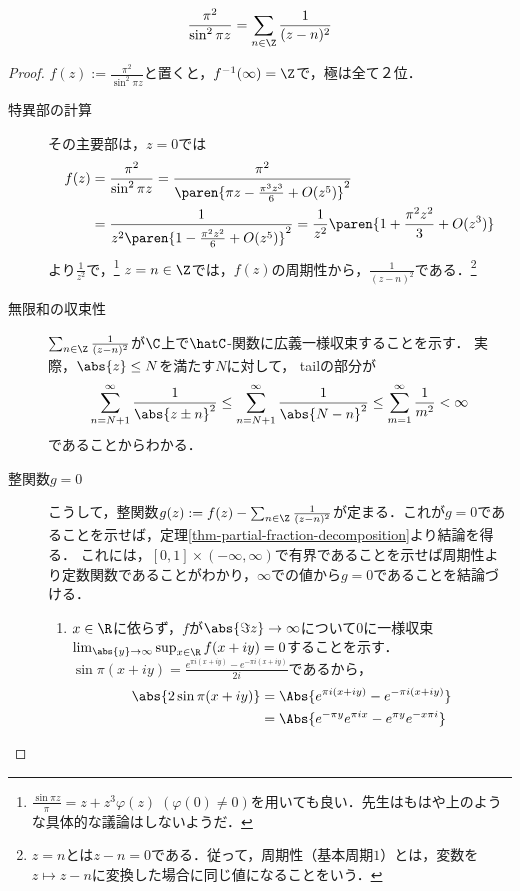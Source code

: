 \documentclass[uplatex, dvipdfmx]{jsreport}
\begin{document}
\begin{proposition}[自乗のものは解きやすい]\label{prop-partial-fractional-decomposition}
    \[\frac{\pi^2}{\sin^2\pi z}=\sum_{n\in\Z}\frac{1}{(z-n)^2}\]
\end{proposition}
\begin{proof}
    $f(z):=\frac{\pi^2}{\sin^2\pi z}$と置くと，$f^{-1}(\infty)=\Z$で，極は全て２位．
    \begin{description}
        \item[特異部の計算]
    その主要部は，$z=0$では
    \begin{align*}
        f(z)&=\frac{\pi^2}{\sin^2\pi z}=\frac{\pi^2}{\paren{\pi z-\frac{\pi^3z^3}{6}+O(z^5)}^2}\\
        &=\frac{1}{z^2\paren{1-\frac{\pi^2z^2}{6}+O(z^5)}^2}=\frac{1}{z^2}\paren{1+\frac{\pi^2z^2}{3}+O(z^3)}
    \end{align*}
    より$\frac{1}{z^2}$で，\footnote{$\frac{\sin\pi z}{\pi}=z+z^3\varphi(z)\;(\varphi(0)\ne 0)$を用いても良い．先生はもはや上のような具体的な議論はしないようだ．}
    $z=n\in\Z$では，$f(z)$の周期性から，$\frac{1}{(z-n)^2}$である．\footnote{$z=n$とは$z-n=0$である．従って，周期性（基本周期$1$）とは，変数を$z\mapsto z-n$に変換した場合に同じ値になることをいう．}
        \item[無限和の収束性] 
        $\sum_{n\in\Z}\frac{1}{(z-n)^2}$が$\C$上で$\hatC$-関数に広義一様収束することを示す．
        実際，$\abs{z}\le N$を満たす$N$に対して，
        tailの部分が
        \[\sum^\infty_{n=N+1}\frac{1}{\abs{z\pm n}^2}\le\sum^\infty_{n=N+1}\frac{1}{\abs{N-n}^2}\le\sum^\infty_{m=1}\frac{1}{m^2}<\infty\]
        であることからわかる．
        \item[整関数$g=0$]
        こうして，整関数$g(z):=f(z)-\sum_{n\in\Z}\frac{1}{(z-n)^2}$が定まる．これが$g=0$であることを示せば，定理\ref{thm-partial-fraction-decomposition}より結論を得る．
        これには，$[0,1]\times(-\infty,\infty)$で有界であることを示せば周期性より定数関数であることがわかり，$\infty$での値から$g=0$であることを結論づける．
        \begin{enumerate}
            \item $x\in\R$に依らず，$f$が$\abs{\Im z}\to\infty$について$0$に一様収束$\lim_{\abs{y}\to\infty}\sup_{x\in\R}f(x+iy)=0$することを示す．
            $\sin \pi(x+iy)=\frac{e^{\pi i(x+iy)}-e^{-\pi i(x+iy)}}{2i}$であるから，
            \begin{align*}
                \abs{2\sin\pi(x+iy)}&=\Abs{e^{\pi i(x+iy)}-e^{-\pi i(x+iy)}}\\
                &=\Abs{e^{-\pi y}e^{\pi ix}-e^{\pi y}e^{-x\pi i}}\\

\end{align*}
\end{enumerate}
\end{description}
\end{proof}
\end{document}
